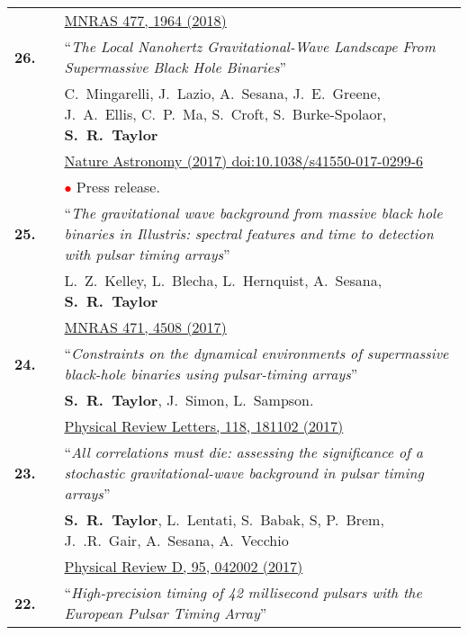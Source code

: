 \documentclass[11pt,letterpaper,sans]{moderncv}
\begin{document}
{\begin{longtable}{rp{0.3cm}p{15.8cm}}
&& \href{https://academic.oup.com/mnras/article-abstract/477/1/964/4937809?redirectedFrom=fulltext}{{\color{color1} MNRAS 477, 1964 (2018)}}  \vspace{0.09cm}\\
\textbf{26.} & & ``\textit{The Local Nanohertz Gravitational-Wave Landscape From Supermassive Black Hole Binaries}'' \\ 
&&C.~Mingarelli, J.~Lazio, A.~Sesana, J.~E.~Greene, J.~A.~Ellis, C.~P.~Ma, S.~Croft, S.~Burke-Spolaor, \textbf{S.~R.~Taylor} \\
&& \href{https://www.nature.com/articles/s41550-017-0299-6}{{\color{color1} Nature Astronomy (2017)
doi:10.1038/s41550-017-0299-6}} \\
&& \textcolor{red}{$\bullet$} Press release. \vspace{0.09cm}\\
\textbf{25.} & & ``\textit{The gravitational wave background from massive black hole binaries in Illustris: spectral features and time to detection with pulsar timing arrays}'' \\ 
&& L.~Z.~Kelley, L.~Blecha, L.~Hernquist, A.~Sesana, \textbf{S.~R.~Taylor} \\ 
&& \href{https://academic.oup.com/mnras/article/471/4/4508/3899130/The-gravitational-wave-background-from-massive}{{\color{color1} MNRAS 471, 4508 (2017)}} \vspace{0.09cm}\\
\textbf{24.} & & ``\textit{Constraints on the dynamical environments of supermassive black-hole binaries using pulsar-timing arrays}'' \\ 
&& \textbf{S.~R.~Taylor}, J.~Simon, L.~Sampson. \\
&& \href{https://journals.aps.org/prl/abstract/10.1103/PhysRevLett.118.181102}{{\color{color1} Physical Review Letters, 118, 181102 (2017)}} \vspace{0.09cm}\\
\textbf{23.} & & ``\textit{All correlations must die: assessing the significance of a stochastic gravitational-wave background in pulsar timing arrays}'' \\ 
&& \textbf{S.~R.~Taylor},  L.~Lentati, S.~Babak, S, P.~Brem, J.~.R.~Gair, A.~Sesana, A.~Vecchio \\ 
&&  \href{https://journals.aps.org/prd/abstract/10.1103/PhysRevD.95.042002}{{\color{color1} Physical Review D, 95, 042002 (2017)}} \vspace{0.09cm}\\
\textbf{22.} & & ``\textit{High-precision timing of 42 millisecond pulsars with the European Pulsar Timing Array}'' \\ 

\end{longtable}}
\end{document}
